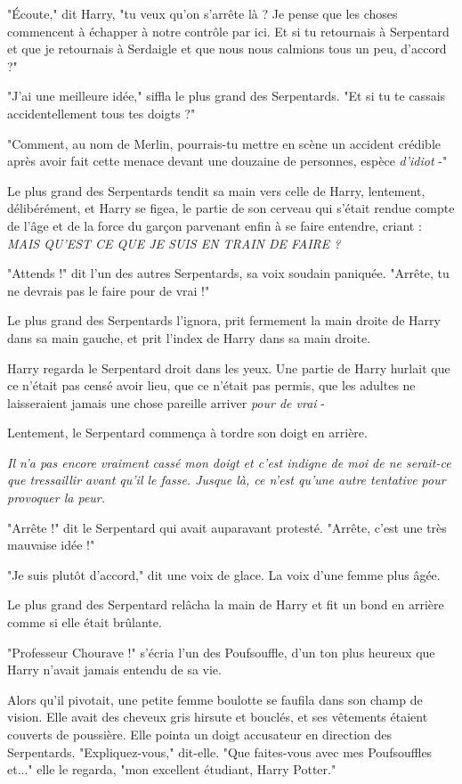 "Écoute," dit Harry, "tu veux qu'on s'arrête là ? Je pense que les choses commencent à échapper à notre contrôle par ici. Et si tu retournais à Serpentard et que je retournais à Serdaigle et que nous nous calmions tous un peu, d'accord ?"

"J'ai une meilleure idée," siffla le plus grand des Serpentards. "Et si tu te cassais accidentellement tous tes doigts ?"

"Comment, au nom de Merlin, pourrais-tu mettre en scène un accident crédible après avoir fait cette menace devant une douzaine de personnes, espèce \emph{d'idiot}  -"

Le plus grand des Serpentards tendit sa main vers celle de Harry, lentement, délibérément, et Harry se figea, le partie de son cerveau qui s'était rendue compte de l'âge et de la force du garçon parvenant enfin à se faire entendre, criant : \emph{MAIS QU'EST CE QUE JE SUIS EN TRAIN DE FAIRE ?} 

"Attends !" dit l'un des autres Serpentards, sa voix soudain paniquée. "Arrête, tu ne devrais pas le faire pour de vrai !"

Le plus grand des Serpentards l'ignora, prit fermement la main droite de Harry dans sa main gauche, et prit l'index de Harry dans sa main droite.

Harry regarda le Serpentard droit dans les yeux. Une partie de Harry hurlait que ce n'était pas censé avoir lieu, que ce n'était pas permis, que les adultes ne laisseraient jamais une chose pareille arriver \emph{pour de vrai}  -

Lentement, le Serpentard commença à tordre son doigt en arrière.

\emph{Il n'a pas encore vraiment cassé mon doigt et c'est indigne de moi de ne serait-ce que tressaillir avant qu'il le fasse. Jusque là, ce n'est qu'une autre tentative pour provoquer la peur.} 

"Arrête !" dit le Serpentard qui avait auparavant protesté. "Arrête, c'est une très mauvaise idée !"

"Je suis plutôt d'accord," dit une voix de glace. La voix d'une femme plus âgée.

Le plus grand des Serpentard relâcha la main de Harry et fit un bond en arrière comme si elle était brûlante.

"Professeur Chourave !" s'écria l'un des Poufsouffle, d'un ton plus heureux que Harry n'avait jamais entendu de sa vie.

Alors qu'il pivotait, une petite femme boulotte se faufila dans son champ de vision. Elle avait des cheveux gris hirsute et bouclés, et ses vêtements étaient couverts de poussière. Elle pointa un doigt accusateur en direction des Serpentards. "Expliquez-vous," dit-elle. "Que faites-vous avec mes Poufsouffles et..." elle le regarda, "mon excellent étudiant, Harry Potter."

